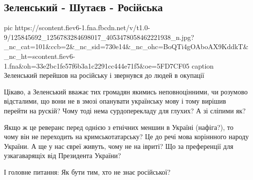  
 
 

\subsection{Зеленський - Шутаєв - Російська}

\ifcmt
pic https://scontent.fiev6-1.fna.fbcdn.net/v/t1.0-9/125845692_1256783284698017_4053478058462221938_n.jpg?_nc_cat=101&ccb=2&_nc_sid=730e14&_nc_ohc=BoQTi4gOAboAX9KddkT&_nc_ht=scontent.fiev6-1.fna&oh=33e2bc1fe57f6b3a1c2291cc444e71f5&oe=5FD7CF05
caption Зеленський перейшов на російську і звернувся до людей в окупації
\fi

Цікаво, а Зеленський вважає тих громадян якимись неповноцінними, чи розумово
відсталими, що вони не в змозі опанувати українську мову і тому вирішив перейти
на рускій? Чому тоді нема сурдоперекладу для глухих? А зі сліпими як? 

Якщо ж це реверанс перед однією з етнічних меншин в Україні (нафіга?), то чому
він не переходить на кримськотатарську? Це до речі мова коріннного народу
України. А ще у нас євреї живуть, чому не на івриті? Що за преференції для
узкагаварящіх від Президента України? 

І головне питання: Як бути тим, хто не знає російської?

